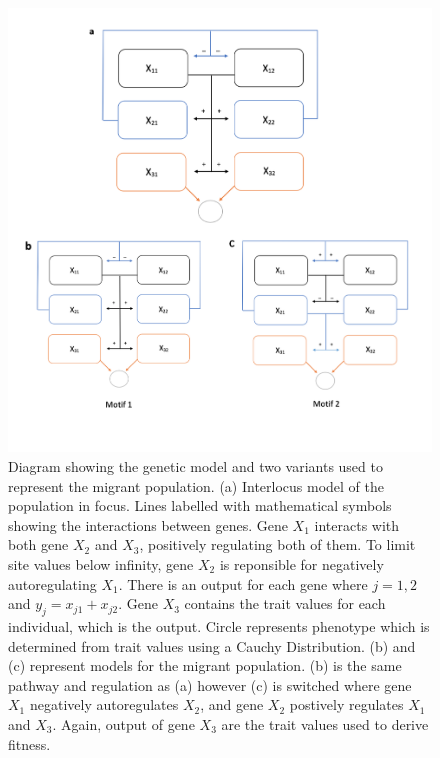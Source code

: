 \begin{figure}
    \begin{center}
        \includegraphics[scale=0.35]{../Results/Model_diagram.jpg}
    \end{center}
    \caption{Diagram showing the genetic model and two variants used to represent the migrant population. (a) Interlocus model of the population in focus. Lines labelled with mathematical symbols showing the interactions between genes. Gene $X_1$ interacts with both gene $X_2$ and $X_3$, positively regulating both of them. To limit site values below infinity, gene $X_2$ is reponsible for negatively autoregulating $X_1$. There is an output for each gene where $j = {1,2}$ and $y_j = x_{j1} + x_{j2}$. Gene $X_3$ contains the trait values for each individual, which is the output. Circle represents phenotype which is determined from trait values using a Cauchy Distribution. (b) and (c) represent models for the migrant population. (b) is the same pathway and regulation as (a) however (c) is switched where gene $X_1$ negatively autoregulates $X_2$, and gene $X_2$ postively regulates $X_1$ and $X_3$. Again, output of gene $X_3$ are the trait values used to derive fitness.}
    \label{fig:Starting parameters}
\end{figure}
